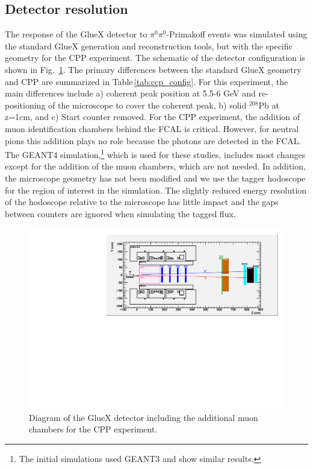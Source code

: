 \subsection{Detector resolution}
\label{sec:acceptance}
The response of the GlueX detector to $\pi^0\pi^0$-Primakoff events
was simulated using the standard GlueX generation and reconstruction
tools, but with the specific geometry for the CPP experiment. The schematic of the detector configuration is shown in
Fig.~\ref{fig:GlueX_cpp}. The primary differences between the
standard GlueX geometry and CPP are summarized in
Table\,\ref{tab:ccp_config}. For this experiment, the main differences
include a) coherent peak position at 5.5-6 GeV and re-positioning of
the microscope to cover the coherent peak, b) solid $^{208}$Pb at
z=1cm, and c) Start counter removed. For the CPP experiment, the
addition of muon identification chambers behind the FCAL is
critical. However, for neutral pions this addition plays no role
because the photons are detected in the FCAL. The GEANT4 simulation,\footnote{The initial simulations used GEANT3
and show similar results.}
which is used for these studies, includes most changes except for the
addition of the muon chambers, which are not needed. In addition, the
microscope geometry has not been modified and we use the tagger
hodoscope for the region of interest in the simulation. The slightly reduced
energy resolution of the hodoscope relative to the microscope has little impact
and the gaps between counters are ignored when simulating the tagged
flux.
\begin{figure}[h!]
\centering
\includegraphics[width=5.25in]{figures/GlueX_cpp.pdf}
\caption{Diagram of the GlueX detector including the additional muon chambers for the CPP experiment.}
\label{fig:GlueX_cpp}
\end{figure}

